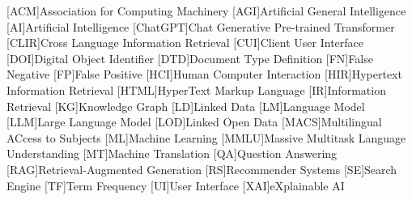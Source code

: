 [ACM]{Association for Computing Machinery}
[AGI]{Artificial General Intelligence}
[AI]{Artificial Intelligence}
[ChatGPT]{Chat Generative Pre-trained Transformer}
[CLIR]{Cross Language Information Retrieval}
[CUI]{Client User Interface}
[DOI]{Digital Object Identifier}
[DTD]{Document Type Definition}
[FN]{False Negative}
[FP]{False Positive}
[HCI]{Human Computer Interaction}
[HIR]{Hypertext Information Retrieval}
[HTML]{HyperText Markup Language}
[IR]{Information Retrieval}
[KG]{Knowledge Graph}
[LD]{Linked Data}
[LM]{Language Model}
[LLM]{Large Language Model}
[LOD]{Linked Open Data}
[MACS]{Multilingual ACcess to Subjects}
[ML]{Machine Learning}
[MMLU]{Massive Multitask Language Understanding}
[MT]{Machine Translation}
[QA]{Question Answering}
[RAG]{Retrieval-Augmented Generation}
[RS]{Recommender Systems}
[SE]{Search Engine}
[TF]{Term Frequency}
[UI]{User Interface}
[XAI]{eXplainable \acs{AI}}
